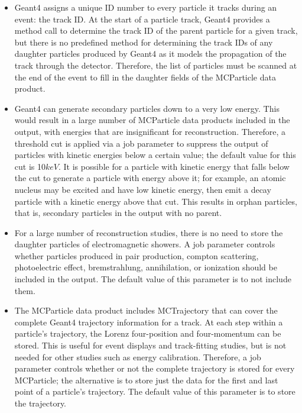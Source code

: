 \documentclass[12pt]{elsarticle}
\begin{document}
\begin{itemize}

\item Geant4 assigns a unique ID number to every particle it tracks
  during an event: the track ID. At the start of a particle track,
  Geant4 provides a method call to determine the track ID of the
  parent particle for a given track, but there is no predefined method
  for determining the track IDs of any daughter particles produced by
  Geant4 as it models the propagation of the track through the
  detector. Therefore, the list of particles must be scanned at the
  end of the event to fill in the daughter fields of the MCParticle
  data product.

\item Geant4 can generate secondary particles down to a very low
  energy. This would result in a large number of MCParticle data
  products included in the output, with energies that are
  insignificant for reconstruction. Therefore, a threshold cut is
  applied via a job parameter to suppress the output of particles with
  kinetic energies below a certain value; the default value for this
  cut is 10$keV$. It is possible for a particle with kinetic
  energy that falls below the cut to generate a particle with energy
  above it; for example, an atomic nucleus may be excited and have low
  kinetic energy, then emit a decay particle with a kinetic energy
  above that cut. This results in orphan particles, that is,
  secondary particles in the output with no parent. 

\item For a large number of reconstruction studies, there is no need
  to store the daughter particles of electromagnetic showers. A job
  parameter controls whether particles produced in pair production,
  compton scattering, photoelectric effect, bremstrahlung,
  annihilation, or ionization should be included in the output. The
  default value of this parameter is to not include them. 

\item The MCParticle data product includes MCTrajectory that can cover the complete Geant4 trajectory
  information for a track. At each step within a particle's
  trajectory, the Lorenz four-position and four-momentum can be
  stored. This is useful for event displays and track-fitting studies,
  but is not needed for other studies such as energy
  calibration. Therefore, a job parameter controls whether or not the
  complete trajectory is stored for every MCParticle; the
  alternative is to store just the data for the first and last point
  of a particle's trajectory. The default value of this parameter is
  to store the trajectory.

\end{itemize}
\end{document}

